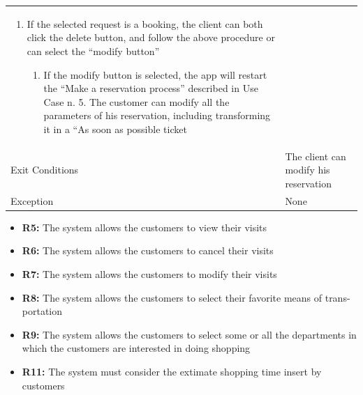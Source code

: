 \documentclass{article}
\newcommand\xrowht[2][0]
{\addstackgap[.5\dimexpr#2\relax]{\vphantom{#1}}}
\begin{document}
\begin{center}
\begin{adjustwidth}{-2.8cm}{}
\begin{tabular}[h!]{|m{7.5em}|m{36em}|}
\begin{enumerate}
\begin{enumerate}
									\item If the selected request is a booking, the client can both click the delete button, and follow the above procedure or can select the “modify button”
									
									\begin{enumerate}
										
										\item If the modify button is selected, the app will restart the “Make a reservation process” described in Use Case n. 5. The customer can modify all the parameters of his reservation, including transforming it in a “As soon as possible ticket
										 
									\end{enumerate}
									
								\end{enumerate}
								
							\end{enumerate}\\
							\xrowht{5pt}
							Exit Conditions & The client can modify his reservation\\
							\xrowht{5pt}
							Exception & None\\	
							\hline
							
						\end{tabular}
					\end{adjustwidth}
					\begin{itemize}
						\medskip
						\newpage
						{\bfseries Required functional requirements: }
						
						
						\item {\bfseries R5: } The system allows the customers to view their visits
						\item {\bfseries R6: } The system allows the customers to cancel their visits
						\item {\bfseries R7: } The system allows the customers to modify their visits
						
						\item {\bfseries R8: } The system allows the customers to select their favorite means of trans-
						portation
						\item {\bfseries R9: } The system allows the customers to select some or all the departments in
						which the customers are interested in doing shopping
						\item {\bfseries R11: } The system must consider the extimate shopping time insert by customers
						

\end{itemize}
\end{center}
\end{document}
